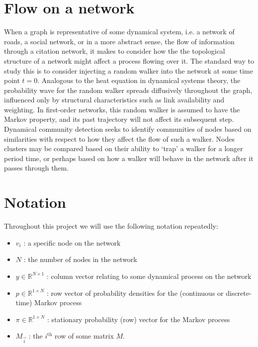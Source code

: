 \documentclass[12pt,a4paper]{article}
\begin{document}
\section{Flow on a network}
When a graph is representative of some dynamical system, i.e. a network of roads, a social network, or in a more abstract sense, the flow of information through a citation network, it makes to consider how the the topological structure of a network might affect a process flowing over it. The standard way to study this is to consider injecting a random walker into the network at some time point $t=0$. Analogous to the heat equation in dynamical systems theory, the probability wave for the random walker spreads diffusively throughout the graph, influenced only by structural characteristics such as link availability and weighting. In first-order networks, this random walker is assumed to have the Markov property, and its past trajectory will not affect its subsequent step. Dynamical community detection seeks to identify communities of nodes based on similarities with respect to how they affect the flow of such a walker. Nodes clusters may be compared based on their ability to `trap' a walker for a longer period time, or perhaps based on how a walker will behave in the network after it passes through them. \\

\section{Notation}
Throughout this project we will use the following notation repeatedly:
\begin{itemize}[label=$\cdot$,nosep]
  \item $v_i$ : a specific node on the network
  \item $N$ : the number  of nodes in the network
  \item $y \in \mathbb{R}^{N \times 1}$ : column vector relating to some dynamical process on the network
  \item $p \in \mathbb{R}^{1\times N}$ : row vector of probability densities for the (continuous or discrete-time) Markov process
  \item $\pi \in \mathbb{R}^{1\times N}$ : stationary probability (row) vector for the Markov process
  \item $M_{\vec i}$ : the $i^{\text{th}}$ row of some matrix $M$.
\end{itemize}
\end{document}
